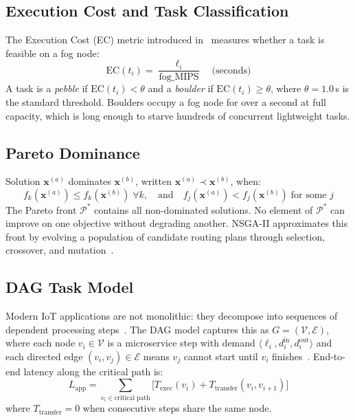 \documentclass[12pt,a4paper]{article}
\begin{document}
\subsection{Execution Cost and Task Classification}

The Execution Cost (EC) metric introduced in~\cite{nouri2024tof} measures whether
a task is feasible on a fog node:
\begin{equation}
  \mathrm{EC}(t_i) = \frac{\ell_i}{\mathrm{fog\_MIPS}} \quad\text{(seconds)}
  \label{eq:ec}
\end{equation}
A task is a \emph{pebble} if $\mathrm{EC}(t_i) < \theta$ and a \emph{boulder}
if $\mathrm{EC}(t_i) \geq \theta$, where $\theta = 1.0$\,s is the standard
threshold. Boulders occupy a fog node for over a second at full capacity, which
is long enough to starve hundreds of concurrent lightweight tasks.

\subsection{Pareto Dominance}

Solution $\mathbf{x}^{(a)}$ dominates $\mathbf{x}^{(b)}$, written
$\mathbf{x}^{(a)} \prec \mathbf{x}^{(b)}$, when:
\begin{equation}
  f_k(\mathbf{x}^{(a)}) \leq f_k(\mathbf{x}^{(b)})\;\forall k,
  \quad\text{and}\quad
  f_j(\mathbf{x}^{(a)}) < f_j(\mathbf{x}^{(b)})\;\text{for some }j
\end{equation}
The Pareto front $\mathcal{P}^*$ contains all non-dominated solutions. No element
of $\mathcal{P}^*$ can improve on one objective without degrading another. NSGA-II
approximates this front by evolving a population of candidate routing plans through
selection, crossover, and mutation~\cite{jafari2021}.

\subsection{DAG Task Model}

Modern IoT applications are not monolithic: they decompose into sequences of
dependent processing steps~\cite{li2025microservice}. The DAG model captures
this as $G = (\mathcal{V}, \mathcal{E})$, where each node $v_i \in \mathcal{V}$
is a microservice step with demand $\langle \ell_i, d_i^{\mathrm{in}},
d_i^{\mathrm{out}} \rangle$ and each directed edge $(v_i, v_j) \in \mathcal{E}$
means $v_j$ cannot start until $v_i$ finishes~\cite{zhu2025dag}. End-to-end
latency along the critical path is:
\begin{equation}
  L_\mathrm{app} = \sum_{v_i \in \mathrm{critical\;path}}
  \bigl[T_\mathrm{exec}(v_i) + T_\mathrm{transfer}(v_i, v_{i+1})\bigr]
  \label{eq:dag}
\end{equation}
where $T_\mathrm{transfer} = 0$ when consecutive steps share the same node.
\end{document}
